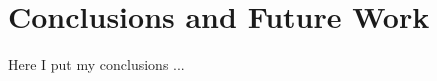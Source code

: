 \def\baselinestretch{1}
\chapter{Conclusions and Future Work} \label{sec:conclusions}
\ifpdf
    \graphicspath{{Conclusions/ConclusionsFigs/PNG/}{Conclusions/ConclusionsFigs/PDF/}{Conclusions/ConclusionsFigs/}}
\else
    \graphicspath{{Conclusions/ConclusionsFigs/EPS/}{Conclusions/ConclusionsFigs/}}
\fi

\def\baselinestretch{1.66}

Here I put my conclusions ...



